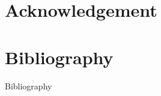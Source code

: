 \documentclass[aspectratio=169]{beamer}
\begin{document}
\frame{\titlepage}                     %















\section*{Acknowledgement}



\section*{Bibliography}
\appendix

\begin{frame}{Bibliography}
    \printbibliography[heading=none]
\end{frame}
\end{document}
